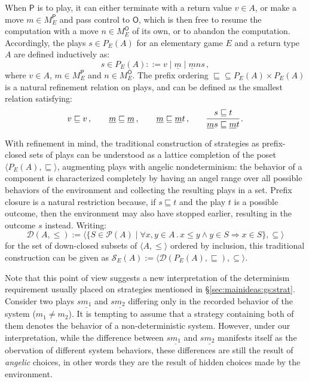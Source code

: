 \documentclass[format=sigplan,authordraft]{acmart}
\newcommand{\kw}[1]{\ensuremath{ \mathsf{#1} }}
\begin{document}
When $\kw{P}$ is to play,
it can either terminate with a return value $v \in A$,
or make a move $m \in M_E^\kw{P}$ and pass control to $\kw{O}$,
which is then free to resume the computation with
a move $n \in M_E^\kw{O}$ of its own,
or to abandon the computation.
Accordingly,
the plays $s \in P_E(A)$
for an elementary game $E$ and a return type $A$
are defined inductively as:
\[
  s \in P_E(A) ::= v \mid \underline{m} \mid \underline{m} ns \,,
\]
where $v \in A$, $m \in M_E^\kw{P}$ and $n \in M_E^\kw{O}$.
The prefix ordering
${\sqsubseteq} \subseteq P_E(A) \times P_E(A)$
is a natural refinement relation on plays,
and can be defined
as the smallest relation satisfying:
\[
  v \sqsubseteq v \,, \qquad
  \underline{m} \sqsubseteq \underline{m} \,, \qquad
  \underline{m} \sqsubseteq \underline{m}t \,, \qquad
  \begin{prooftree}
    \hypo{s \sqsubseteq t}
    \infer1{\underline{m}s \sqsubseteq \underline{m}t}
  \end{prooftree} \,.
\]

With refinement in mind,
the traditional construction of strategies
as prefix-closed sets of plays
can be understood as a lattice completion of the poset
$\langle P_E(A), {\sqsubseteq} \rangle$,
augmenting plays with angelic nondeterminism:
the behavior of a component is characterized completely
by having an angel range over all possible behaviors of the environment
and collecting the resulting plays in a set.
Prefix closure is a natural restriction because,
if $s \sqsubseteq t$ and the play $t$ is a possible outcome,
then the environment may also have stopped earlier,
resulting in the outcome $s$ instead.
Writing:
\[
  \mathcal{D}(A, {\le}) :=
    \langle
    \{ S \in \mathcal{P}(A) \mid
        \forall x, y \in A \,.\,
           x \le y \wedge y \in S \Rightarrow x \in S \},
    {\subseteq}
    \rangle
\]
for the set of down-closed subsets of $\langle A, {\le} \rangle$
ordered by inclusion,
this traditional construction can be given as
$\mathcal{S}_E(A) :=
\langle \mathcal{D}(P_E(A), {\sqsubseteq}), {\subseteq} \rangle$.

Note that this point of view suggests a new interpretation
of the determinism requirement usually placed on strategies
mentioned in \S\ref{sec:mainideas:gs:strat}.
Consider
two plays $s\underline{m_1}$ and $s\underline{m_2}$
differing only in the recorded behavior of the system
($m_1 \neq m_2$).
It is tempting to assume that
a strategy containing both of them
denotes the behavior of a non-deterministic system.
However,
under our interpretation,
while the difference between $s\underline{m_1}$ and $s\underline{m_2}$
manifests itself as the obervation of different system behaviors,
these differences are still the result of \emph{angelic} choices,
in other words they are the result of hidden choices made by the
environment.
\end{document}
